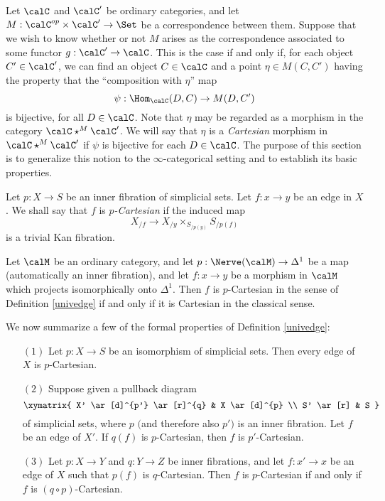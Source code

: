 Let $\calC$ and $\calC'$ be ordinary categories, and let $M: \calC^{op} \times \calC' \rightarrow \Set$ be a correspondence between them. Suppose that we wish to know whether or not $M$ arises as the correspondence associated to some functor $g: \calC' \rightarrow \calC$. This is the case if and only if, for each object $C' \in \calC'$, we can find an object $C \in \calC$ and a point $\eta \in M(C,C')$
having the property that the ``composition with $\eta$'' map 
$$\psi: \Hom_{\calC}(D,C) \rightarrow M(D,C')$$ is bijective, for all $D \in \calC$. Note that
$\eta$ may be regarded as a morphism in the category
$ \calC \star^{M} \calC' $. We will say that $\eta$ is a {\it Cartesian} morphism in $\calC \star^{M} \calC'$ if $\psi$ is bijective for each $D \in \calC$. The purpose of this section is to generalize this notion to the $\infty$-categorical setting and to establish its basic properties.

\begin{definition}\label{univedge}
Let $p: X \rightarrow S$ be an inner fibration of simplicial sets.
Let $f: x \rightarrow y$ be an edge in $X$. We shall say that $f$
is {\it $p$-Cartesian} if the induced map
$$ X_{/f} \rightarrow X_{/y} \times_{ S_{/p(y)} } S_{/p(f)}$$ 
is a trivial Kan fibration.
\end{definition}

\begin{remark}
Let $\calM$ be an ordinary category, and let $p: \Nerve(\calM) \rightarrow \Delta^1$ be a map (automatically an inner fibration), and let $f: x \rightarrow y$ be a morphism in $\calM$ which projects isomorphically onto $\Delta^1$. Then $f$ is $p$-Cartesian in the sense of Definition \ref{univedge} if and only if it is Cartesian in the classical sense.
\end{remark}

We now summarize a few of the formal properties of Definition \ref{univedge}:

\begin{proposition}\label{stuch}
\begin{itemize}
\item[$(1)$] Let $p: X \rightarrow S$ be an isomorphism of simplicial sets. Then every edge of $X$ is $p$-Cartesian.

\item[$(2)$] Suppose given a pullback diagram
$$ \xymatrix{ X' \ar[d]^{p'} \ar[r]^{q} & X \ar[d]^{p} \\
S' \ar[r] & S }$$
of simplicial sets, where $p$ $($and therefore also $p'${}$)$ is an inner fibration. Let
$f$ be an edge of $X'$. If $q(f)$ is $p$-Cartesian, then $f$ is $p'$-Cartesian.

\item[$(3)$] Let $p: X \rightarrow Y$ and $q: Y \rightarrow Z$ be
inner fibrations, and let $f: x' \rightarrow x$ be an edge of $X$ such that $p(f)$ is $q$-Cartesian. Then
$f$ is $p$-Cartesian if and only if $f$ is $(q \circ p)$-Cartesian.
\end{itemize}
\end{proposition}

